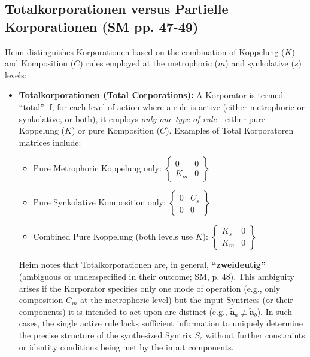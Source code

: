 \documentclass[
    12pt,              %
    a4paper,           %
    headings=normal,   %
    twoside=true,      %
    BCOR=8mm,          %
]{scrbook}
\newcommand{\q}[1]{\enquote{#1}}
\newcommand{\metrophor}{\bm{\widetilde{a}}}
\begin{document}
\subsection{Totalkorporationen versus Partielle Korporationen (SM pp. 47-49)}
\label{sec:ch3_total_partial} 

Heim distinguishes Korporationen based on the combination of Koppelung (\(K\)) and Komposition (\(C\)) rules employed at the metrophoric (\(m\)) and synkolative (\(s\)) levels:

\begin{itemize}
    \item   \textbf{Totalkorporationen (Total Corporations):} A Korporator is termed \q{total} if, for each level of action where a rule is active (either metrophoric or synkolative, or both), it employs \textit{only one type of rule}—either pure Koppelung (\(K\)) or pure Komposition (\(C\)). Examples of Total Korporatoren matrices include:
        \begin{itemize}
            \item   Pure Metrophoric Koppelung only: \( \begin{Bmatrix} 0 & 0 \\ K_m & 0 \end{Bmatrix} \)
            \item   Pure Synkolative Komposition only: \( \begin{Bmatrix} 0 & C_s \\ 0 & 0 \end{Bmatrix} \)
            \item   Combined Pure Koppelung (both levels use \(K\)): \( \begin{Bmatrix} K_s & 0 \\ K_m & 0 \end{Bmatrix} \)
        \end{itemize}
        Heim notes that Totalkorporationen are, in general, \textbf{\q{zweideutig}} (ambiguous or underspecified in their outcome; SM, p. 48). This ambiguity arises if the Korporator specifies only one mode of operation (e.g., only composition \(C_m\) at the metrophoric level) but the input Syntrices (or their components) it is intended to act upon are distinct (e.g., \(\metrophor_a \not\equiv \metrophor_b\)). In such cases, the single active rule lacks sufficient information to uniquely determine the precise structure of the synthesized Syntrix \(S_c\) without further constraints or identity conditions being met by the input components.


\end{itemize}
\end{document}
